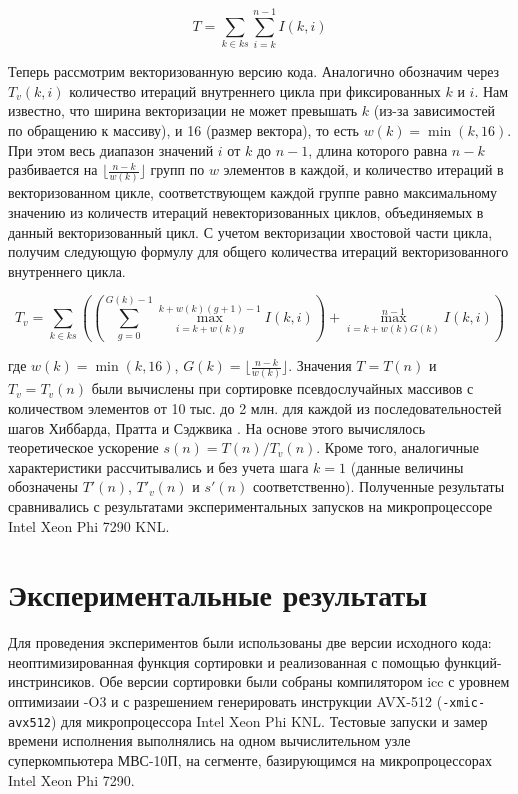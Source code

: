 \documentclass[utf8]{psta}
\begin{document}
\begin{equation}
T = \sum_{k \in ks}{\sum_{i = k}^{n - 1}{I(k, i)}}
\end{equation}

Теперь рассмотрим векторизованную версию кода. 
Аналогично обозначим через $T_v(k,i)$ количество итераций внутреннего цикла при фиксированных $k$ и $i$. 
Нам известно, что ширина векторизации не может превышать $k$ (из-за зависимостей по обращению к массиву), и 16 (размер вектора), то есть $w(k) = \min(k, 16)$. 
При этом весь диапазон значений $i$ от $k$ до $n - 1$, длина которого равна $n - k$ разбивается на $\lfloor \frac{n - k}{w(k)} \rfloor$ групп по $w$ элементов в каждой, и количество итераций в векторизованном цикле, соответствующем каждой группе равно максимальному значению из количеств итераций невекторизованных циклов, объединяемых в данный векторизованный цикл. 
С учетом векторизации хвостовой части цикла, получим следующую формулу для общего количества итераций векторизованного внутреннего цикла.

\begin{equation}
T_v = \sum_{k \in ks}
{
\left(
\left(
\sum_{g = 0}^{G(k) - 1}{\max_{i = k + w(k)g}^{k + w(k)(g + 1) - 1}{I(k, i)}}
\right)
+ \max_{i = k + w(k)G(k)}^{n - 1}{I(k, i)}
\right)
}
\end{equation}

где $w(k) = \min(k, 16)$, $G(k) = \lfloor \frac{n - k}{w(k)} \rfloor$. 
Значения $T = T(n)$ и $T_v = T_v(n)$ были вычислены при сортировке псевдослучайных массивов с количеством элементов от 10 тыс. до 2 млн. для каждой из последовательностей шагов Хиббарда, Пратта и Сэджвика \cite{Pratt_seq,Hib_seq,Sedjw_seq}. 
На основе этого вычислялось теоретическое ускорение $s(n) = T(n)/T_v(n)$. 
Кроме того, аналогичные характеристики рассчитывались и без учета шага $k = 1$ (данные величины обозначены $T'(n)$, $T'_v(n)$ и $s'(n)$ соответственно). 
Полученные результаты сравнивались с результатами экспериментальных запусков на микропроцессоре Intel Xeon Phi 7290 KNL.

\section{Экспериментальные результаты}
 
Для проведения экспериментов были использованы две версии исходного кода: неоптимизированная функция сортировки и реализованная с помощью функций-инстринсиков.
Обе версии сортировки были собраны компилятором icc с уровнем оптимизаии -O3 и с разрешением генерировать инструкции AVX-512 (\texttt{-xmic-avx512}) для микропроцессора Intel Xeon Phi KNL.
Тестовые запуски и замер времени исполнения выполнялись на одном вычислительном узле суперкомпьютера МВС-10П, на сегменте, базирующимся на микропроцессорах Intel Xeon Phi 7290. 
 
\end{document}
